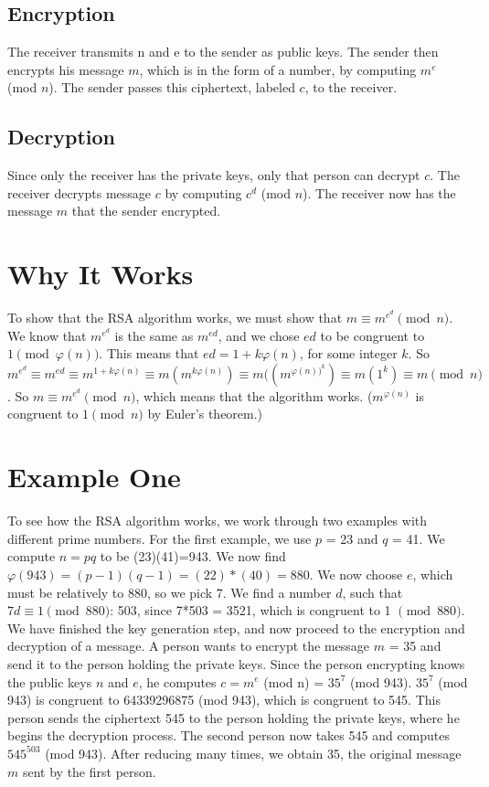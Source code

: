 \documentclass[12pt]{article}
\begin{document}
\subsection{Encryption}
The receiver transmits n and e to the sender as public keys. The sender then encrypts his message $m$, which is in the form of a number, by computing $m^e$ (mod $n$). The sender passes this ciphertext, labeled $c$, to the receiver. 

\subsection{Decryption}
Since only the receiver has the private keys, only that person can decrypt $c$. The receiver decrypts message $c$ by computing $c^d$ (mod $n$). The receiver now has the message $m$ that the sender encrypted.


\section{Why It Works}
To show that the RSA algorithm works, we must show that $m \equiv m^{e^d} \pmod{n}$. We know that $m^{e^d}$ is the same as $m^{ed}$, and we chose $ed$ to be congruent to $1 \pmod{\varphi(n)}$. This means that $ed = 1+k\varphi(n)$, for some integer $k$. So $m^{e^d} \equiv m^{ed} \equiv m^{1+k\varphi(n)} \equiv m(m^{k\varphi(n)}) \equiv m((m^{\varphi(n))^k}) \equiv m(1^k) \equiv m \pmod{n}$. So $m \equiv m^{e^d} \pmod{n}$, which means that the algorithm works. ($m^{\varphi(n)}$ is congruent to $1 \pmod{n}$ by Euler's theorem.) 


\section{Example One}

To see how the RSA algorithm works, we work through two examples with different prime numbers. For the first example, we use $p$ = 23 and $q$ = 41. We compute $n=pq$ to be (23)(41)=943. We now find $\varphi(943) = (p-1)(q-1) = (22)*(40) = 880$. We now choose $e$, which must be relatively to 880, so we pick 7. We find a number $d$, such that $7d  \equiv 1 \pmod{880}$: 503, since 7*503 = 3521, which is congruent to 1 $\pmod{880}$. We have finished the key generation step, and now proceed to the encryption and decryption of a message. A person wants to encrypt the message $m$ = 35 and send it to the person holding the private keys. Since the person encrypting knows the public keys $n$ and $e$, he computes $c = m^e$ (mod n) = $35^7$ (mod 943). $35^7$ (mod 943) is congruent to 64339296875 (mod 943), which is congruent to 545. This person sends the ciphertext 545 to the person holding the private keys, where he begins the decryption process. The second person now takes 545 and computes $545^{503}$ (mod 943). After reducing many times, we obtain 35, the original message $m$ sent by the first person. 
\end{document}
